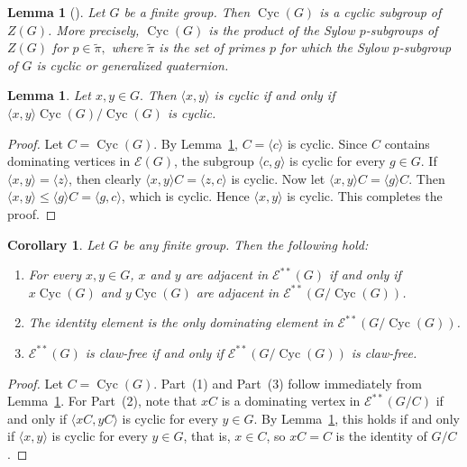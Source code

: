\documentclass[preprint,11pt]{elsarticle}
\newcommand{\cyc}{\operatorname{Cyc}}
\newtheorem{lemma}[theorem]{\bf Lemma}
\newtheorem{corollary}[theorem]{\bf Corollary}
\begin{document}
\begin{lemma}[{\cite[Theorem 9.1 (b)]{PJC-Graphs-def-grp}}]\label{Lemma:K-cyclic-enh}
 Let $G$ be a finite group. Then $\cyc(G)$ is a cyclic subgroup of $Z(G)$. More precisely, $\cyc(G)$ is the product of the Sylow $p$-subgroups of $Z(G)$ for $p \in \tilde \pi,$ where $\tilde \pi$ is the set of
 primes $p$ for which the Sylow $p$-subgroup of $G$ is cyclic or generalized quaternion.
\end{lemma}

\begin{lemma}\label{Lemma:Cyclic-iff-cyclic}
	Let $x, y \in G.$ Then $\langle x, y\rangle$ is cyclic if and only if 
	$\langle x, y\rangle\cyc(G)/\cyc(G)$ is cyclic.                                         
\end{lemma}

\begin{proof}
	Let $C = \cyc(G)$.
	By Lemma~\ref{Lemma:K-cyclic-enh}, $C = \langle c\rangle$ is cyclic.       
	Since $C$ contains dominating vertices in $\mathcal{E}(G)$, the subgroup
	$\langle c, g\rangle$ is cyclic for every $g \in G$.
	If $\langle x, y\rangle = \langle z\rangle$, then clearly
	$\langle x, y\rangle C = \langle z, c\rangle$ is cyclic.
	Now let $\langle x, y\rangle C = \langle g\rangle C$. Then
	$\langle x, y\rangle \leq \langle g\rangle C = \langle g, c\rangle$, 
	which is cyclic. Hence $\langle x, y\rangle$ is cyclic.
	This completes the proof.
\end{proof}

\begin{corollary}\label{behacyc}
	Let $G$ be any finite group. Then the following hold:
	\begin{enumerate}
		\item For every $x, y \in G$, $x$ and $y$ are adjacent in 
		$\mathcal{E}^{**}(G)$ if and only if $x\cyc(G)$ and $y\cyc(G)$ 
		are adjacent in $\mathcal{E}^{**}(G/\cyc(G))$.
		\item The identity element is the only dominating element in 
		$\mathcal{E}^{**}(G/\cyc(G))$.
		\item $\mathcal{E}^{**}(G)$ is claw-free if and only if 
		$\mathcal{E}^{**}(G/\cyc(G))$ is claw-free.
	\end{enumerate}
\end{corollary}

\begin{proof}
	Let $C = \cyc(G)$. Part~(1) and Part~(3) follow immediately from 
	Lemma~\ref{Lemma:Cyclic-iff-cyclic}. For Part~(2), note that 
	$xC$ is a dominating vertex in $\mathcal{E}^{**}(G/C)$ if and only 
	if $\langle xC, yC\rangle$ is cyclic for every $y \in G$. By 
	Lemma~\ref{Lemma:Cyclic-iff-cyclic}, this holds if and only if 
	$\langle x, y\rangle$ is cyclic for every $y \in G$, that is, 
	$x \in C$, so $xC = C$ is the identity of $G/C$.
\end{proof}
\end{document}
